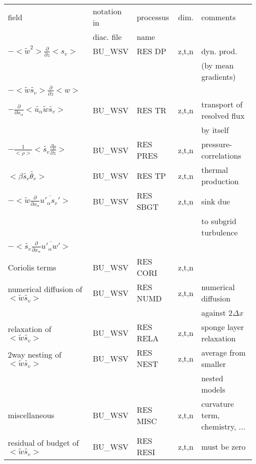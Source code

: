 \begin{center}
\begin{tabular}{||p{5cm}|>{\centering}p{2cm}|>{\centering}p{2.5cm}|>{\centering}p{0.5cm}|p{5.5cm }||}
\hline
\hline
field & notation in & processus & dim.  & comments \\
      & diac. file & name      &            & \\
\hline
\hline
$-<\tilde{w}^2>\frac{\partial }{\partial z}<s_v>$ & BU\_WSV & RES DP   & z,t,n & dyn. prod.\\
 & & & &(by mean gradients) \\
$-<\tilde{w}\tilde{s_v}>\frac{\partial }{\partial z}<w>$ &  &  & & \\
\hline
$-\frac{\partial}{\partial x_\alpha} <\tilde{u_\alpha} \tilde{w}\tilde{s_v}>$ & BU\_WSV & RES TR   & z,t,n & transport of resolved flux\\
 & & & &by itself \\
\hline
$- \frac{1}{<\rho>}<\tilde{s_v} \frac{\partial \tilde{p}}{\partial z}>$ & BU\_WSV & RES PRES & z,t,n & pressure-correlations \\
\hline
$ <\beta  \tilde{s_v}\tilde{\theta_v}> $  & BU\_WSV & RES TP   & z,t,n & thermal production \\
\hline
$- <\tilde{w}\frac{\partial}{\partial x_\alpha}\overline{u'_\alpha s_v'}>$
& BU\_WSV & RES SBGT & z,t,n & sink due \\
 & & & &to subgrid turbulence \\
$- <\tilde{s_v}\frac{\partial}{\partial x_\alpha}\overline{u'_\alpha w'}>$
&&&&\\
\hline
{\rm Coriolis terms} & BU\_WSV & RES CORI & z,t,n & \\
\hline
{\rm numerical diffusion of } $<\tilde{w}\tilde{s_v}>$& BU\_WSV & RES NUMD & z,t,n & numerical diffusion\\
 & & & &against $2\Delta x$ \\
\hline
{\rm relaxation of }$<\tilde{w}\tilde{s_v}>$ & BU\_WSV & RES RELA & z,t,n& sponge layer relaxation \\
\hline
{\rm 2way nesting of }$<\tilde{w}\tilde{s_v}>$ & BU\_WSV & RES NEST & z,t,n& average from smaller\\
 & & & &nested models \\
\hline
{\rm miscellaneous} & BU\_WSV & RES MISC & z,t,n & curvature term, chemistry, ...\\
\hline
{\rm residual of budget of} $<\tilde{w}\tilde{s_v}>$ & BU\_WSV & RES RESI & z,t,n & must be zero \\

\end{tabular}
\end{center}
